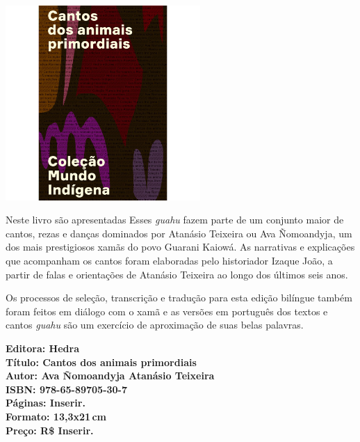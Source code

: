 \begin{center}
\hspace*{-3.6cm}
\hspace*{3.1cm}\includegraphics[width=74mm]{./CAPAS/HEDRA_CANTOS.jpg}
\end{center}
\hspace*{-7cm}\hrulefill\hspace*{-7cm}
\medskip

\noindent{}Neste livro são apresentadas  Esses \textit{guahu} fazem parte de um conjunto maior de cantos, rezas e danças dominados por Atanásio Teixeira ou Ava Ñomoandyja, um dos mais prestigiosos xamãs do povo Guarani Kaiowá. As narrativas e explicações que acompanham os cantos foram elaboradas pelo historiador Izaque João, a partir de falas e orientações de Atanásio Teixeira ao longo dos últimos seis anos. 

Os processos de seleção, transcrição e tradução para esta edição bilíngue também foram feitos em diálogo com o xamã e as versões em português dos textos e cantos \textit{guahu} são um exercício de aproximação de suas belas palavras.

\vfill
\noindent\begin{minipage}[c]{1\linewidth}
{\small\textbf{
\hspace*{-.1cm}Editora: Hedra\\
Título: Cantos dos animais primordiais\\
Autor: Ava Ñomoandyja Atanásio Teixeira\\ 
ISBN: 978-65-89705-30-7\\
Páginas: Inserir.\\
Formato: 13,3x21\,cm\\
Preço: R\$ Inserir.\\
}}
\end{minipage}
\pagebreak

